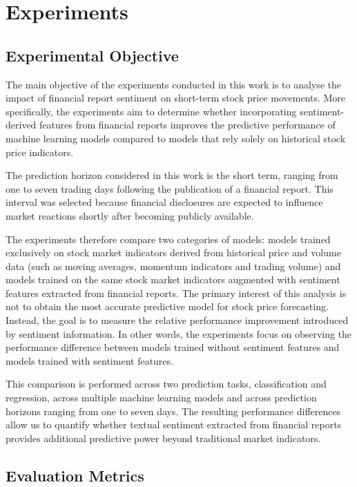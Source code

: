 \chapter{Experiments}

\section{Experimental Objective}

The main objective of the experiments conducted in this work is to analyse the impact of financial report sentiment on short-term stock price movements. More specifically, the experiments aim to determine whether incorporating sentiment-derived features from financial reports improves the predictive performance of machine learning models compared to models that rely solely on historical stock price indicators.

The prediction horizon considered in this work is the short term, ranging from one to seven trading days following the publication of a financial report. This interval was selected because financial disclosures are expected to influence market reactions shortly after becoming publicly available.

The experiments therefore compare two categories of models: models trained exclusively on stock market indicators derived from historical price and volume data (such as moving averages, momentum indicators and trading volume)
and models trained on the same stock market indicators augmented with sentiment features extracted from financial reports.
The primary interest of this analysis is not to obtain the most accurate predictive model for stock price forecasting. Instead, the goal is to measure the relative performance improvement introduced by sentiment information. In other words, the experiments focus on observing the performance difference between models trained without sentiment features and models trained with sentiment features.

This comparison is performed across two prediction tasks, classification and regression, across multiple machine learning models and across prediction horizons ranging from one to seven days.
The resulting performance differences allow us to quantify whether textual sentiment extracted from financial reports provides additional predictive power beyond traditional market indicators.

\section{Evaluation Metrics}

